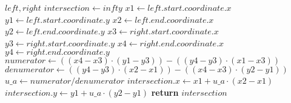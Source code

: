 \begin{algorithm}[ht]
\caption{}
\label{alg:linesegmenintersection}
\begin{algorithmic}[1]
	\Require $\mathit{left}, \mathit{right}$
	\State $\mathit{intersection} \gets infty$
	\State $\mathit{x1} \gets \mathit{left.start.coordinate.x}$
	\State $\mathit{y1} \gets \mathit{left.start.coordinate.y}$
	\State $\mathit{x2} \gets \mathit{left.end.coordinate.x}$
	\State $\mathit{y2} \gets \mathit{left.end.coordinate.y}$
	\State $\mathit{x3} \gets \mathit{right.start.coordinate.x}$
	\State $\mathit{y3} \gets \mathit{right.start.coordinate.y}$
	\State $\mathit{x4} \gets \mathit{right.end.coordinate.x}$
	\State $\mathit{y4} \gets \mathit{right.end.coordinate.y}$
	\State $\mathit{numerator} \gets ((\mathit{x4} - \mathit{x3}) \cdot (\mathit{y1} - \mathit{y3})) - ((\mathit{y4} - \mathit{y3}) \cdot (\mathit{x1} - \mathit{x3}))$
	\State $\mathit{denumerator} \gets ((\mathit{y4} - \mathit{y3}) \cdot (\mathit{x2} - \mathit{x1})) - ((\mathit{x4} - \mathit{x3}) \cdot (\mathit{y2} - \mathit{y1}))$
	\State $\mathit{u\_a} \gets \mathit{numerator} / \mathit{denumerator}$
	\State $\mathit{intersection.x} \gets \mathit{x1} + \mathit{u\_a} \cdot (\mathit{x2} - \mathit{x1})$
	\State $\mathit{intersection.y} \gets \mathit{y1} + \mathit{u\_a} \cdot (\mathit{y2} - \mathit{y1})$
	\State \textbf{return} $\mathit{intersection}$
\end{algorithmic}
\end{algorithm}
